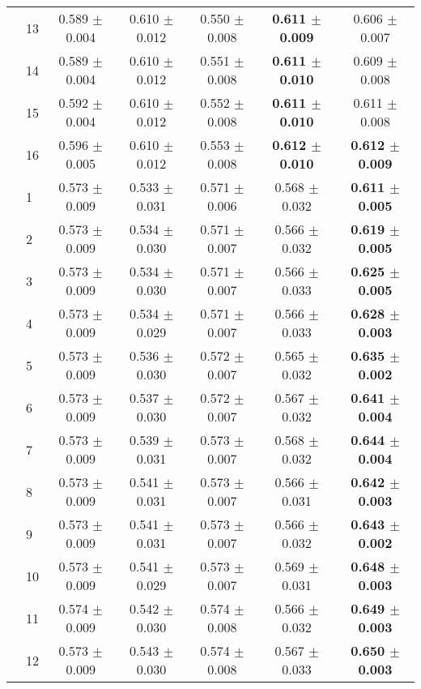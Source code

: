\begin{table*}[t]
{\begin{tabular}{ll c c c c c}
        & 13 & 0.589 $\pm$ 0.004 & 0.610 $\pm$ 0.012 & 0.550 $\pm$ 0.008 & \textbf{0.611 $\pm$ 0.009} & 0.606 $\pm$ 0.007 \\
        & 14 & 0.589 $\pm$ 0.004 & 0.610 $\pm$ 0.012 & 0.551 $\pm$ 0.008 & \textbf{0.611 $\pm$ 0.010} & 0.609 $\pm$ 0.008 \\
        & 15 & 0.592 $\pm$ 0.004 & 0.610 $\pm$ 0.012 & 0.552 $\pm$ 0.008 & \textbf{0.611 $\pm$ 0.010} & 0.611 $\pm$ 0.008 \\
        & 16 & 0.596 $\pm$ 0.005 & 0.610 $\pm$ 0.012 & 0.553 $\pm$ 0.008 & \textbf{0.612 $\pm$ 0.010} & \textbf{0.612 $\pm$ 0.009} \\
\midrule
\assist{} & 1 & 0.573 $\pm$ 0.009 & 0.533 $\pm$ 0.031 & 0.571 $\pm$ 0.006 & 0.568 $\pm$ 0.032 & \textbf{0.611 $\pm$ 0.005} \\
        & 2 & 0.573 $\pm$ 0.009 & 0.534 $\pm$ 0.030 & 0.571 $\pm$ 0.007 & 0.566 $\pm$ 0.032 & \textbf{0.619 $\pm$ 0.005} \\
        & 3 & 0.573 $\pm$ 0.009 & 0.534 $\pm$ 0.030 & 0.571 $\pm$ 0.007 & 0.566 $\pm$ 0.033 & \textbf{0.625 $\pm$ 0.005} \\
        & 4 & 0.573 $\pm$ 0.009 & 0.534 $\pm$ 0.029 & 0.571 $\pm$ 0.007 & 0.566 $\pm$ 0.033 & \textbf{0.628 $\pm$ 0.003} \\
        & 5 & 0.573 $\pm$ 0.009 & 0.536 $\pm$ 0.030 & 0.572 $\pm$ 0.007 & 0.565 $\pm$ 0.032 & \textbf{0.635 $\pm$ 0.002} \\
        & 6 & 0.573 $\pm$ 0.009 & 0.537 $\pm$ 0.030 & 0.572 $\pm$ 0.007 & 0.567 $\pm$ 0.032 & \textbf{0.641 $\pm$ 0.004} \\
        & 7 & 0.573 $\pm$ 0.009 & 0.539 $\pm$ 0.031 & 0.573 $\pm$ 0.007 & 0.568 $\pm$ 0.032 & \textbf{0.644 $\pm$ 0.004} \\
        & 8 & 0.573 $\pm$ 0.009 & 0.541 $\pm$ 0.031 & 0.573 $\pm$ 0.007 & 0.566 $\pm$ 0.031 & \textbf{0.642 $\pm$ 0.003} \\
        & 9 & 0.573 $\pm$ 0.009 & 0.541 $\pm$ 0.031 & 0.573 $\pm$ 0.007 & 0.566 $\pm$ 0.032 & \textbf{0.643 $\pm$ 0.002} \\
        & 10 & 0.573 $\pm$ 0.009 & 0.541 $\pm$ 0.029 & 0.573 $\pm$ 0.007 & 0.569 $\pm$ 0.031 & \textbf{0.648 $\pm$ 0.003} \\
        & 11 & 0.574 $\pm$ 0.009 & 0.542 $\pm$ 0.030 & 0.574 $\pm$ 0.008 & 0.566 $\pm$ 0.032 & \textbf{0.649 $\pm$ 0.003} \\
        & 12 & 0.573 $\pm$ 0.009 & 0.543 $\pm$ 0.030 & 0.574 $\pm$ 0.008 & 0.567 $\pm$ 0.033 & \textbf{0.650 $\pm$ 0.003} \\

\end{tabular}}
\end{table*}

